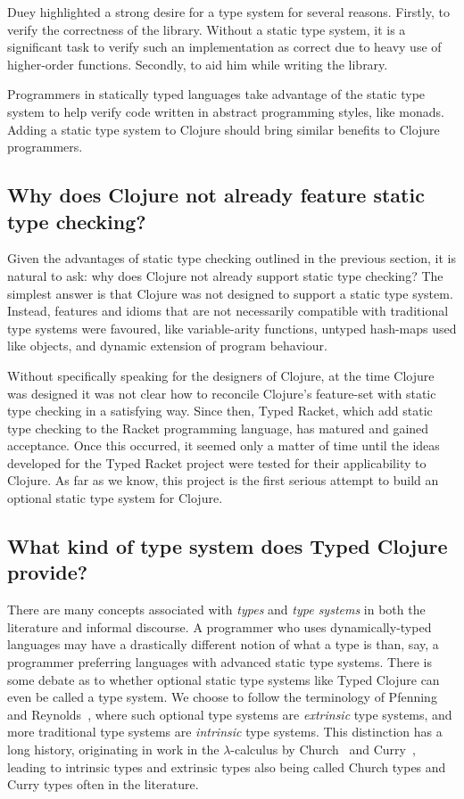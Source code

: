 Duey highlighted a strong desire for a type system for several reasons.
Firstly, to verify the correctness of the library.
Without a static type system, it is a significant task
to verify such an implementation as correct due to heavy use
of higher-order functions.
Secondly, to aid him while writing the library.

Programmers in statically typed languages take advantage of the static type system
to help verify code written in abstract programming styles, like monads.
Adding a static type system to Clojure should bring similar benefits to Clojure programmers.

\subsection{Why does Clojure not already feature static type checking?}

Given the advantages of static type checking outlined in the previous section, it is natural to ask:
why does Clojure not already support static type checking?
The simplest answer is that Clojure was not designed to support a static type system.
Instead, features and idioms that are not necessarily compatible with traditional type systems
were favoured, like variable-arity functions, untyped hash-maps used like objects, and dynamic extension of program behaviour.

Without specifically speaking for the designers of Clojure, at the time Clojure was designed
it was not clear how to reconcile Clojure's feature-set with static type checking in a satisfying way.
Since then, Typed Racket, which add static type checking to the Racket programming language,
has matured and gained acceptance.
Once this occurred, it seemed only a matter of time until the ideas developed for the Typed Racket project 
were tested for their applicability to Clojure. 
As far as we know, this project is the first serious attempt to build an optional static type system for Clojure.

\subsection{What kind of type system does Typed Clojure provide?}


There are many concepts associated with \emph{types} and \emph{type systems} in both the
literature and informal discourse.
A programmer who uses dynamically-typed languages may have a drastically different notion
of what a type is than, say, a programmer preferring languages with advanced static type systems.
There is some debate as to whether optional static type systems like Typed Clojure
can even be called a type system. We choose to
follow the terminology of Pfenning~\cite{Pfe08} and Reynolds~\cite{Rey02},
where such optional type systems are \emph{extrinsic} type systems, and more
traditional type systems are \emph{intrinsic} type systems.
This distinction has a long history, originating in work in the $\lambda$-calculus 
by Church~\cite{Chu40} and Curry~\cite{Cur34},
leading to intrinsic types and extrinsic types also being called Church types and
Curry types often in the literature.

